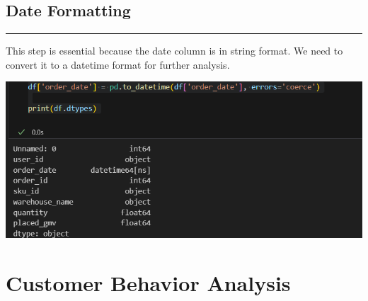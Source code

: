 \documentclass{article}
\begin{document}
    \subsection{Date Formatting}
    \begin{center}
        \color{green}\rule{1\linewidth}{0.7mm}
    \end{center}
    This step is essential because the date column is in string format. We need to convert it to a datetime format for further analysis.{
        \begin{center}
            \includegraphics[width=1\columnwidth]{images/datatype.png}
        \end{center}
    }



\section{Customer Behavior Analysis}
\end{document}
